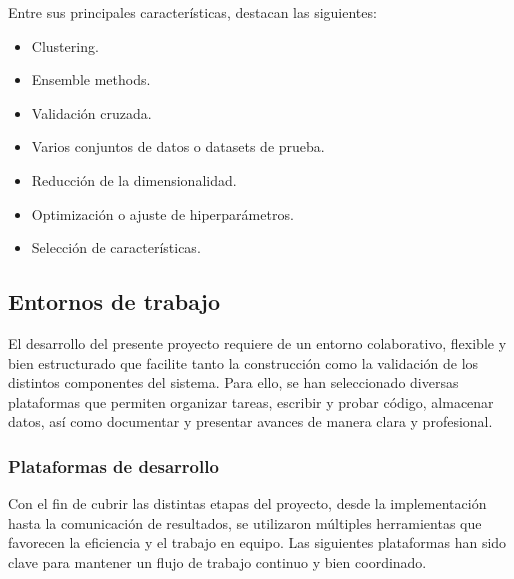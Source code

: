 \begin{itemize}
	Entre sus principales características, \cite{itop_scikitlearn} destacan las siguientes:
	
	\begin{itemize}
		
		\item Clustering.
		
		\item Ensemble methods.
		
		\item Validación cruzada.
		
		\item Varios conjuntos de datos o datasets de prueba.
		
		\item Reducción de la dimensionalidad.
		
		\item Optimización o ajuste de hiperparámetros.
		
		\item Selección de características.
		
	\end{itemize}

\end{itemize}

\subsection{Entornos de trabajo}

El desarrollo del presente proyecto requiere de un entorno colaborativo, flexible y bien estructurado que facilite tanto la construcción como la validación de los distintos componentes del sistema. Para ello, se han seleccionado diversas plataformas que permiten organizar tareas, escribir y probar código, almacenar datos, así como documentar y presentar avances de manera clara y profesional.

\subsubsection{Plataformas de desarrollo}

Con el fin de cubrir las distintas etapas del proyecto, desde la implementación hasta la comunicación de resultados, se utilizaron múltiples herramientas que favorecen la eficiencia y el trabajo en equipo. Las siguientes plataformas han sido clave para mantener un flujo de trabajo continuo y bien coordinado.

